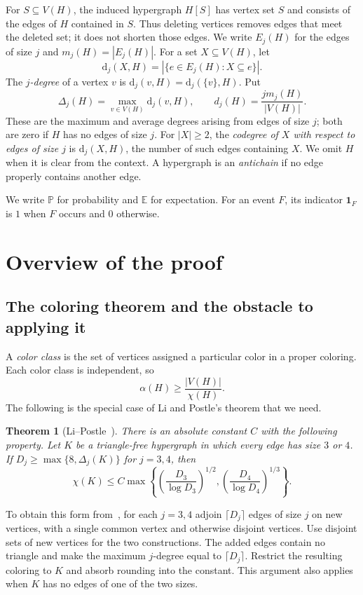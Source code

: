 \documentclass[11pt]{article}
\numberwithin{equation}{section}
\newtheorem{theorem}{Theorem}[section]
\theoremstyle{remark}
\newcommand{\E}{\mathbb E}
\newcommand{\Pp}{\mathbb P}
\newcommand{\ind}{\mathbf 1}
\newcommand{\dd}{\mathrm d}
\begin{document}
For $S\subseteq V(H)$, the induced hypergraph $H[S]$ has vertex set $S$ and consists of the edges of $H$ contained in $S$. Thus deleting vertices removes edges that meet the deleted set; it does not shorten those edges. We write $E_j(H)$ for the edges of size $j$ and $m_j(H)=|E_j(H)|$. For a set $X\subseteq V(H)$, let
\[
 \dd_j(X,H)=|\{e\in E_j(H):X\subseteq e\}|.
\]
The \emph{$j$-degree} of a vertex $v$ is $\dd_j(v,H)=\dd_j(\{v\},H)$. Put
\[
 \Delta_j(H)=\max_{v\in V(H)}\dd_j(v,H),
 \qquad d_j(H)=\frac{j m_j(H)}{|V(H)|}.
\]
These are the maximum and average degrees arising from edges of size $j$; both are zero if $H$ has no edges of size $j$. For $|X|\ge2$, the \emph{codegree of $X$ with respect to edges of size $j$} is $\dd_j(X,H)$, the number of such edges containing $X$. We omit $H$ when it is clear from the context. A hypergraph is an \emph{antichain} if no edge properly contains another edge.

We write $\Pp$ for probability and $\E$ for expectation. For an event $F$, its indicator $\ind_F$ is $1$ when $F$ occurs and $0$ otherwise.

\section{Overview of the proof}\label{sec:overview}

\subsection{The coloring theorem and the obstacle to applying it}
A \emph{color class} is the set of vertices assigned a particular color in a proper coloring. Each color class is independent, so
\[
 \alpha(H)\ge\frac{|V(H)|}{\chi(H)}.
\]
The following is the special case of Li and Postle's theorem that we need.

\begin{theorem}[{Li--Postle~\cite[Theorem 1.4]{LP}}]\label{thm:LP}
There is an absolute constant $C$ with the following property. Let $K$ be a triangle-free hypergraph in which every edge has size $3$ or $4$. If $D_j\ge\max\{8,\Delta_j(K)\}$ for $j=3,4$, then
\[
 \chi(K)\le C\max\left\{
 \left(\frac{D_3}{\log D_3}\right)^{1/2},
 \left(\frac{D_4}{\log D_4}\right)^{1/3}
 \right\}.
\]
\end{theorem}

To obtain this form from~\cite[Theorem 1.4]{LP}, for each $j=3,4$ adjoin $\lceil D_j\rceil$ edges of size $j$ on new vertices, with a single common vertex and otherwise disjoint vertices. Use disjoint sets of new vertices for the two constructions. The added edges contain no triangle and make the maximum $j$-degree equal to $\lceil D_j\rceil$. Restrict the resulting coloring to $K$ and absorb rounding into the constant. This argument also applies when $K$ has no edges of one of the two sizes.
\end{document}
